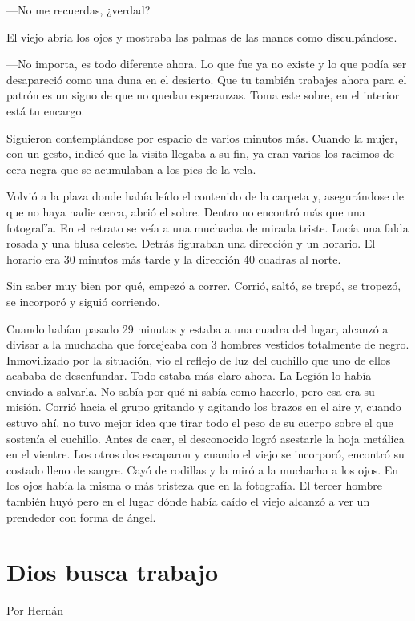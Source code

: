\documentclass[11pt,twoside,openright,a5paper]{book}
\begin{document}
---No me recuerdas, ¿verdad?

El viejo abría los ojos y mostraba las palmas de las manos como disculpándose.

---No importa, es todo diferente ahora. Lo que fue ya no existe y lo que podía ser desapareció como una duna en el desierto. Que tu también trabajes ahora para el patrón es un signo de que no quedan esperanzas. Toma este sobre, en el interior está tu encargo.

Siguieron contemplándose por espacio de varios minutos más. Cuando la mujer, con un gesto, indicó que la visita llegaba a su fin, ya eran varios los racimos de cera negra que se acumulaban a los pies de la vela.

Volvió a la plaza donde había leído el contenido de la carpeta y, asegurándose de que no haya nadie cerca, abrió el sobre. Dentro no encontró más que una fotografía. En el retrato se veía a una muchacha de mirada triste. Lucía una falda rosada y una blusa celeste. Detrás figuraban una dirección y un horario. El horario era 30 minutos más tarde y la dirección 40 cuadras al norte.

Sin saber muy bien por qué, empezó a correr. Corrió, saltó, se trepó, se tropezó, se incorporó y siguió corriendo.

Cuando habían pasado 29 minutos y estaba a una cuadra del lugar, alcanzó a divisar a la muchacha que forcejeaba con 3 hombres vestidos totalmente de negro. Inmovilizado por la situación, vio el reflejo de luz del cuchillo que uno de ellos acababa de desenfundar. Todo estaba más claro ahora. La Legión lo había enviado a salvarla. No sabía por qué ni sabía como hacerlo, pero esa era su misión. Corrió hacia el grupo gritando y agitando los brazos en el aire y, cuando estuvo ahí, no tuvo mejor idea que tirar todo el peso de su cuerpo sobre el que sostenía el cuchillo. Antes de caer, el desconocido logró asestarle la hoja metálica en el vientre. Los otros dos escaparon y cuando el viejo se incorporó, encontró su costado lleno de sangre. Cayó de rodillas y la miró a la muchacha a los ojos. En los ojos había la misma o más tristeza que en la fotografía. El tercer hombre también huyó pero en el lugar dónde había caído el viejo alcanzó a ver un prendedor con forma de ángel.   

\section*{Dios busca trabajo}
                                                                                          \begin{flushright}Por Hernán\end{flushright}
\end{document}
